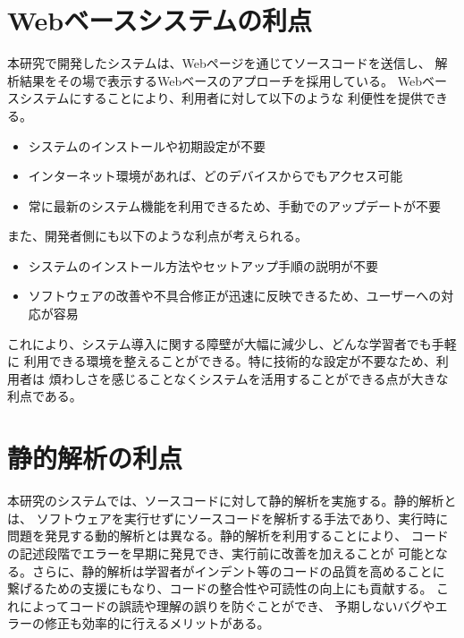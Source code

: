 \documentclass{cssspaper}
\begin{document}
        \section{Webベースシステムの利点}
        本研究で開発したシステムは、Webページを通じてソースコードを送信し、
        解析結果をその場で表示するWebベースのアプローチを採用している。
        Webベースシステムにすることにより、利用者に対して以下のような
        利便性を提供できる。

        \begin{itemize}
           \item システムのインストールや初期設定が不要
           \item インターネット環境があれば、どのデバイスからでもアクセス可能
           \item 常に最新のシステム機能を利用できるため、手動でのアップデートが不要
        \end{itemize}

        また、開発者側にも以下のような利点が考えられる。

        \begin{itemize}
           \item システムのインストール方法やセットアップ手順の説明が不要
           \item ソフトウェアの改善や不具合修正が迅速に反映できるため、ユーザーへの対応が容易
        \end{itemize}

        これにより、システム導入に関する障壁が大幅に減少し、どんな学習者でも手軽に
        利用できる環境を整えることができる。特に技術的な設定が不要なため、利用者は
        煩わしさを感じることなくシステムを活用することができる点が大きな利点である。

        \section{静的解析の利点}
        本研究のシステムでは、ソースコードに対して静的解析を実施する。静的解析とは、
        ソフトウェアを実行せずにソースコードを解析する手法であり、実行時に
        問題を発見する動的解析とは異なる。静的解析を利用することにより、
        コードの記述段階でエラーを早期に発見でき、実行前に改善を加えることが
        可能となる。さらに、静的解析は学習者がインデント等のコードの品質を高めることに
        繋げるための支援にもなり、コードの整合性や可読性の向上にも貢献する。
        これによってコードの誤読や理解の誤りを防ぐことができ、
        予期しないバグやエラーの修正も効率的に行えるメリットがある。
\end{document}
